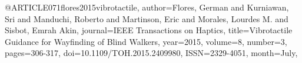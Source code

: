 @ARTICLE{071flores2015vibrotactile,
author={Flores, German and Kurniawan, Sri and Manduchi, Roberto and Martinson, Eric and Morales, Lourdes M. and Sisbot, Emrah Akin},
journal={IEEE Transactions on Haptics}, 
title={Vibrotactile Guidance for Wayfinding of Blind Walkers}, 
year={2015},
volume={8},
number={3},
pages={306-317},
doi={10.1109/TOH.2015.2409980},
ISSN={2329-4051},
month={July},}